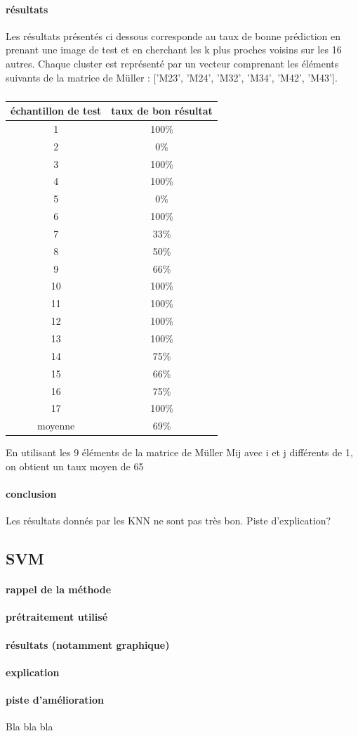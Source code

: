 \documentclass[a4paper,10pt]{report}
\begin{document}
\paragraph{résultats}
Les résultats présentés ci dessous corresponde au taux de bonne prédiction en prenant une image de test et en cherchant les k plus proches voisins sur les 16 autres. Chaque cluster est représenté par un vecteur comprenant les éléments suivants de la matrice de Müller : ['M23', 'M24', 'M32', 'M34', 'M42', 'M43'].
\subparagraph{}
\begin{center}
\begin{tabular}{|c|c|}  
  \hline
  échantillon de test & taux de bon résultat \\
  \hline
  1 & 100\%\\
  2 & 0\%\\
  3 & 100\%\\
  4 & 100\%\\
  5 & 0\%\\
  6  & 100\%\\
  7 & 33\%\\  
  8 & 50\%\\
  9 & 66\%\\
  10 & 100\%\\
  11 & 100\%\\
  12 & 100\%\\
  13 & 100\%\\
  14 & 75\%\\
  15 & 66\%\\
  16 & 75\%\\
  17 & 100\%\\
  \hline
  moyenne & 69\%\\  
  \hline
\end{tabular}
\end{center}

En utilisant les 9 éléments de la matrice de Müller Mij avec i et j différents de 1, on obtient un taux moyen de 65%
\paragraph{conclusion}
Les résultats donnés par les KNN ne sont pas très bon. Piste d'explication?

\subsection{SVM}
\paragraph{rappel de la méthode}
\paragraph{prétraitement utilisé}
\paragraph{résultats (notamment graphique)}
\paragraph{explication}
\paragraph{piste d'amélioration}
\tableofcontents


Bla bla bla

\listoffigures
\listoftables
\printindex
\end{document}
